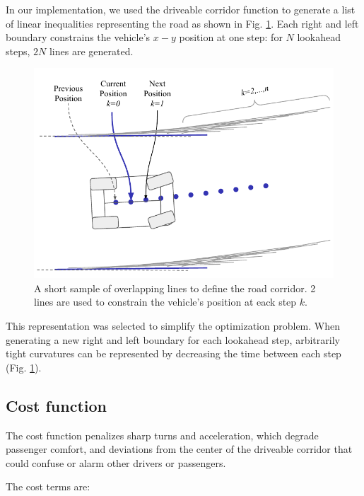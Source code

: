\documentclass[letterpaper, 10 pt, conference]{ieeeconf}  %
\begin{document}
In our implementation, we used the driveable corridor function to generate a list of linear inequalities representing the road as shown in Fig. \ref{fig:roadpolygons}. Each right and left boundary constrains the vehicle's $x-y$ position at one step: for $N$ lookahead steps, $2N$ lines are generated.

 \begin{figure}[h]
 	\centering
 	\includegraphics[width=0.9\linewidth]{figures/road_final_bounds.pdf}
 	\caption{A short sample of overlapping lines to define the road corridor. 2 lines are used to constrain the vehicle's position at eack step $k$.}
 	\label{fig:roadpolygons}
 \end{figure}
 
 This representation was selected to simplify the optimization problem. When generating a new right and left boundary for each lookahead step, arbitrarily tight curvatures can be represented by decreasing the time between each step (Fig. \ref{fig:roadpolygons}).
 
 \subsection{Cost function}
 The cost function penalizes sharp turns and acceleration, which degrade passenger comfort, and deviations from the center of the driveable corridor that could confuse or alarm other drivers or passengers.
 
 The cost terms are:
 
\end{document}
